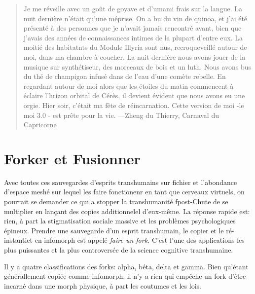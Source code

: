 \begin{quotation} Je me réveille avec un goût de goyave et d'umami frais sur la langue. La nuit dernière n'était qu'une méprise. On a bu du vin de quinoa, et j'ai été présenté à des personnes que je n'avait jamais rencontré avant, bien que j'avais des années de connaissances intimes de la plupart d'entre eux. La moitié des habitatnts du Module Illyria sont nus, recroqueveillé autour de moi, dans ma chambre à coucher. La nuit dernière nous avons jouer de la musique sur synthétiseur, des morceaux de bois et un luth. Nous avons bus du thé de champigon infusé dans de l'eau d'une comète rebelle. En regardant autour de moi alors que les étoiles du matin commencent à éclaire l'hrizon orbital de Cérès, il devient évident que nous avons eu une orgie. Hier soir, c'était ma fête de réincarnation. Cette version de moi -le moi 3.0 - est prête pour la vie. —Zheng du Thierry, Carnaval du Capricorne \end{quotation} 

\section{Forker et Fusionner} 

Avec toutes ces sauvegardes d'esprits transhumains sur fichier et l'abondance d'espace meshé sur lequel les faire fonctionenr en tant que cerveaux virtuels, on pourrait se demander ce qui a stopper la transhumanité fpost-Chute de se multiplier en lançant des copies additionnelel d'eux-même. La réponse rapide est: rien, à part la stigmatisation sociale massive et les problèmes psychologiques épineux. Prendre une sauvegarde d'un esprit transhumain, le copier et le ré-instantiet en infomorph est appelé \textit{faire un fork.} C'est l'une des applications les plus puissantes et la plus controversée de la science cognitive transhumaine. 

Il y a quatre classifications des forks: alpha, béta, delta et gamma. Bien qu'étant générallement copiée comme infomorph, il n'y a rien qui empêche un fork d'être incarné dans une morph physique, à part les coutumes et les lois. 

